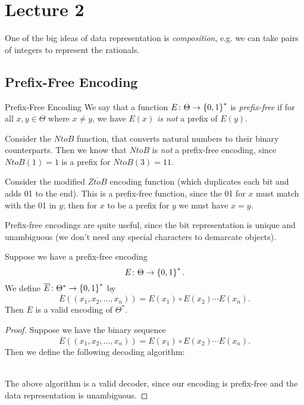 \documentclass[class=article, crop=false]{standalone}
\begin{document}
  \section{Lecture 2}
  One of the big ideas of data representation is \emph{composition}, e.g. we can take pairs of integers to represent the rationals.
  \subsection{Prefix-Free Encoding}
  \begin{definition}{Prefix-Free Encoding}
    We say that a function $E\colon \Theta\to \left\{0, 1\right\}^*$ is \emph{prefix-free} if for all $x,y\in\Theta$ where $x\neq y$, we have $E(x)$ \emph{is not} a prefix of $E(y)$.
  \end{definition}
  \begin{example}{}
    Consider the $NtoB$ function, that converts natural numbers to their binary counterparts. Then we know that $NtoB$ is \emph{not} a prefix-free encoding, since $NtoB(1) = 1$ is a prefix for $NtoB(3) = 11$.
  \end{example}
  \begin{example}{}
    Consider the modified $\overline{ZtoB}$ encoding function (which duplicates each bit and adds 01 to the end). This is a prefix-free function, since the 01 for $x$ must match with the 01 in $y$; then for $x$ to be a prefix for $y$ we must have $x = y$.
  \end{example}
  Prefix-free encodings are quite useful, since the bit representation is unique and unambiguous (we don't need any special characters to demarcate objects).
  \begin{theorem}{}
    Suppose we have a prefix-free encoding
    \[
      E\colon \Theta\to \left\{0, 1\right\}^*.
    \]
    We define $\overline{E}\colon \Theta^*\to \left\{0, 1\right\}^*$ by
    \[
      \overline{E}((x_1,x_2,\dotsc,x_n)) = E(x_1)\circ E(x_2)\dotsb E(x_n).
    \]
    Then $\overline{E}$ is a valid encoding of $\Theta^*$.
    
  \end{theorem}
  \begin{proof}
    Suppose we have the binary sequence
    \[
      \overline{E}((x_1,x_2,\dotsc,x_n)) = E(x_1)\circ E(x_2)\dotsb E(x_n).
    \]
    Then we define the following decoding algorithm:
    \begin{algorithm}
      \DontPrintSemicolon
      \caption{}
    \end{algorithm} \\
    The above algorithm is a valid decoder, since our encoding is prefix-free and the data representation is unambiguous.
  \end{proof}
\end{document}
